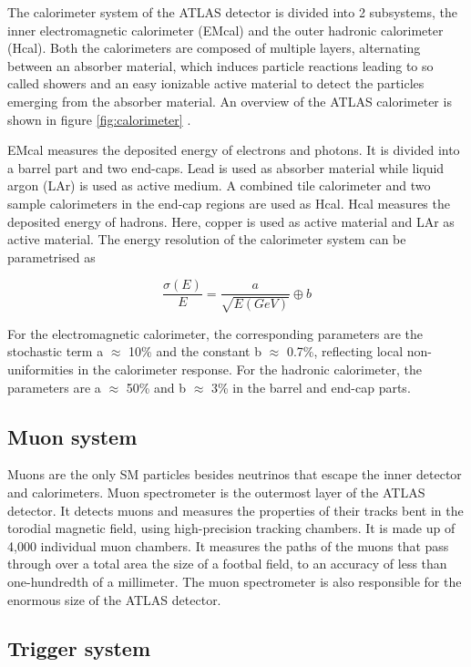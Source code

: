 The calorimeter system of the ATLAS detector is divided into 2 subsystems, the inner electromagnetic calorimeter (EMcal) and the outer hadronic calorimeter (Hcal). Both the calorimeters are composed of multiple layers, alternating between an absorber material, which induces particle reactions leading to so called showers and an easy ionizable active material to detect the particles emerging from the absorber material. An overview of the ATLAS calorimeter is shown in figure \ref{fig:calorimeter} . 

EMcal measures the deposited energy of electrons and photons. It is divided into a barrel part and two end-caps. Lead is used as absorber material while liquid argon (LAr) is used as active medium. A combined tile calorimeter and two sample calorimeters in the end-cap regions are used as Hcal. Hcal measures the deposited energy of hadrons. Here, copper is used as active material and LAr as active material. The energy resolution of the calorimeter system can be parametrised as

\begin{equation}
    \label{calorimeter}
     \frac{\sigma(E)}{E} = \frac{a}{\sqrt{E(GeV)}}\oplus b
\end{equation}

For the electromagnetic calorimeter, the corresponding parameters are the stochastic term a $\approx$ 10\% and the constant b $\approx$ 0.7\%, reflecting local non-uniformities in the calorimeter response. For the hadronic calorimeter, the parameters are a $\approx$ 50\% and b $\approx$ 3\% in the barrel and end-cap parts.

\subsection{Muon system}
\label{sec:muonsystem}
Muons are the only SM particles besides neutrinos that escape the inner detector and calorimeters. Muon spectrometer is the outermost layer of the ATLAS detector. It detects muons and measures the properties of their tracks bent in the torodial magnetic field, using high-precision tracking chambers. It is made up of 4,000 individual muon chambers.  It measures the paths of the muons that pass through over a total area the size of a footbal field, to an accuracy of less than one-hundredth of a millimeter. The muon spectrometer is also responsible for the enormous size of the ATLAS detector.





\subsection{Trigger system}
\label{sec:triggersystem}

